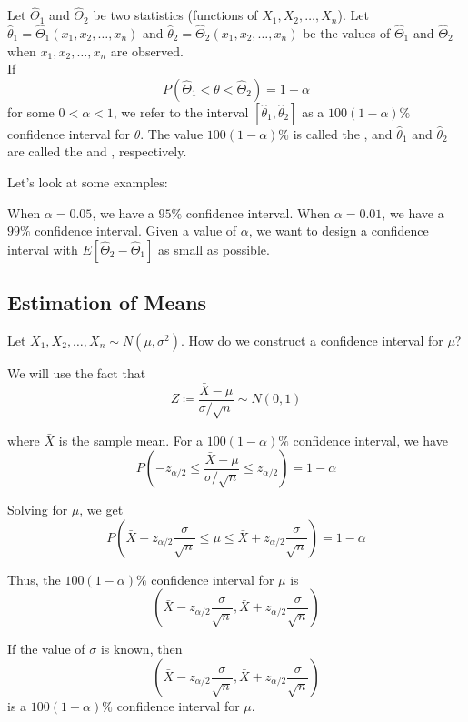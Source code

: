 \documentclass[11pt]{article}
\begin{document}
\begin{definition}
	Let \(\hat{\Theta}_1\) and \(\hat{\Theta}_2\) be two statistics (functions of \(X_1, X_2, \ldots, X_n\)). Let \(\hat{\theta}_1 = \hat{\Theta}_1(x_1, x_2, \ldots, x_n)\) and \(\hat{\theta}_2 = \hat{\Theta}_2(x_1, x_2, \ldots, x_n)\) be the values of \(\hat{\Theta}_1\) and \(\hat{\Theta}_2\) when \(x_1, x_2, \ldots, x_n\) are observed. \\
	If
	\[ P(\hat{\Theta}_1 < \theta < \hat{\Theta}_2) = 1 - \alpha \]
	for some \(0 < \alpha < 1\), we refer to the interval \([\hat{\theta}_1, \hat{\theta}_2]\) as a \(100(1 - \alpha)\%\) confidence interval for \(\theta\).
	The value \(100(1 - \alpha)\%\) is called the , and \(\hat{\theta}_1\) and \(\hat{\theta}_2\) are called the  and , respectively.
\end{definition}
Let's look at some examples:
\begin{example}

	When $\alpha = 0.05$, we have a $95\%$ confidence interval.
	When $\alpha = 0.01$, we have a $99\%$ confidence interval.
	Given a value of $\alpha$, we want to design a confidence interval with
	$E[\hat{\Theta}_2 - \hat{\Theta}_1]$ as small as possible.
\end{example}
\subsection{Estimation of Means}\label{Section 11.2}
Let \(X_1, X_2, \ldots, X_n \sim N(\mu, \sigma^2)\). How do we construct a confidence interval for \(\mu\)?

We will use the fact that
\[ Z \coloneqq \frac{\bar{X} - \mu}{\sigma / \sqrt{n}} \sim N(0,1) \]

where \(\bar{X}\) is the sample mean. For a \(100(1 - \alpha)\%\) confidence interval, we have
\[ P\left( -z_{\alpha/2} \leq \frac{\bar{X} - \mu}{\sigma / \sqrt{n}} \leq z_{\alpha/2} \right) = 1 - \alpha \]

Solving for \(\mu\), we get
\[ P\left( \bar{X} - z_{\alpha/2} \frac{\sigma}{\sqrt{n}} \leq \mu \leq \bar{X} + z_{\alpha/2} \frac{\sigma}{\sqrt{n}} \right) = 1 - \alpha \]

Thus, the \(100(1 - \alpha)\%\) confidence interval for \(\mu\) is
\[ \left( \bar{X} - z_{\alpha/2} \frac{\sigma}{\sqrt{n}}, \bar{X} + z_{\alpha/2} \frac{\sigma}{\sqrt{n}} \right) \]

\begin{theorem}
	If the value of $\sigma$ is known, then
	\[ \left( \bar{X} - z_{\alpha/2} \frac{\sigma}{\sqrt{n}}, \bar{X} + z_{\alpha/2} \frac{\sigma}{\sqrt{n}} \right) \]
	is a $100(1 - \alpha)\%$ confidence interval for $\mu$.
\end{theorem}
\end{document}
